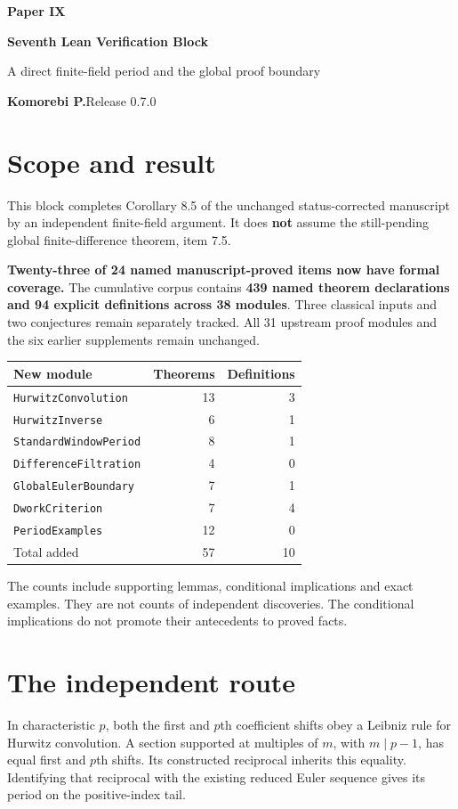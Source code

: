 \documentclass[11pt]{article}
\begin{document}
{\LARGE\bfseries\color{ink}Paper IX}\par
{\Large\bfseries Seventh Lean Verification Block}\par
{\large A direct finite-field period and the global proof boundary}\par
\textbf{Komorebi P.}\hfill Release 0.7.0
\bigskip
\section*{Scope and result}
This block completes Corollary 8.5 of the unchanged status-corrected manuscript by an independent finite-field argument. It does \textbf{not} assume the still-pending global finite-difference theorem, item 7.5.

\textbf{Twenty-three of 24 named manuscript-proved items now have formal coverage.} The cumulative corpus contains \textbf{439 named theorem declarations and 94 explicit definitions across 38 modules}. Three classical inputs and two conjectures remain separately tracked. All 31 upstream proof modules and the six earlier supplements remain unchanged.

\begin{center}
\begin{tabular}{@{}p{}rr@{}}
\toprule
New module & Theorems & Definitions\\\midrule
\texttt{HurwitzConvolution} & 13 & 3\\
\texttt{HurwitzInverse} & 6 & 1\\
\texttt{StandardWindowPeriod} & 8 & 1\\
\texttt{DifferenceFiltration} & 4 & 0\\
\texttt{GlobalEulerBoundary} & 7 & 1\\
\texttt{DworkCriterion} & 7 & 4\\
\texttt{PeriodExamples} & 12 & 0\\\midrule
Total added & 57 & 10\\\bottomrule
\end{tabular}
\end{center}
The counts include supporting lemmas, conditional implications and exact examples. They are not counts of independent discoveries. The conditional implications do not promote their antecedents to proved facts.

\section*{The independent route}
In characteristic $p$, both the first and $p$th coefficient shifts obey a Leibniz rule for Hurwitz convolution. A section supported at multiples of $m$, with $m\mid p-1$, has equal first and $p$th shifts. Its constructed reciprocal inherits this equality. Identifying that reciprocal with the existing reduced Euler sequence gives its period on the positive-index tail.
\end{document}
